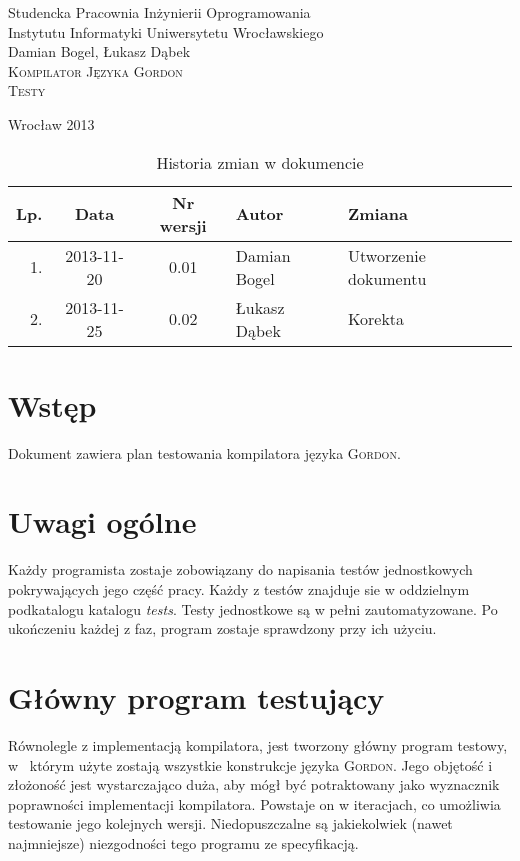 \documentclass{documentation}
\begin{document}
\begin{titlepage}
\begin{center}
Studencka Pracownia Inżynierii Oprogramowania\\
Instytutu Informatyki Uniwersytetu Wrocławskiego\\[6cm]

Damian Bogel, Łukasz Dąbek\\[1cm]
\textsc{\LARGE Kompilator Języka Gordon}\\[0.5cm]
\textsc{\large Testy}

\vfill
Wrocław 2013 \\[2.5cm]

\end{center}
\end{titlepage}

\newpage
\begin{table}
	\centering
    \captionsetup{name=Tabela,labelsep=period}
	\caption{Historia zmian w dokumencie}
		\begin{tabular}{|r|c|c|l|l|}
		\hline
		Lp.  & Data       & Nr wersji & Autor                 & Zmiana \\ \hline
		1.   & 2013-11-20 & 0.01 & Damian Bogel & Utworzenie dokumentu \\ \hline
		2.   & 2013-11-25 & 0.02 & Łukasz Dąbek & Korekta \\ \hline
	\end{tabular}
\end{table}
\newpage

\tableofcontents
\setcounter{page}{2}

\newpage

\section{Wstęp}
\noindent Dokument zawiera plan testowania kompilatora języka
\textsc{Gordon}.

\section{Uwagi ogólne}
\noindent Każdy programista zostaje zobowiązany do napisania testów
jednostkowych pokrywających jego część pracy. Każdy z testów znajduje sie w
oddzielnym podkatalogu katalogu \emph{tests}. Testy jednostkowe są w pełni
zautomatyzowane. Po ukończeniu każdej z faz, program zostaje sprawdzony przy
ich użyciu.

\section{Główny program testujący}
\noindent Równolegle z implementacją kompilatora, jest tworzony główny program
testowy, w~ którym użyte zostają wszystkie konstrukcje języka \textsc{Gordon}.
Jego objętość i złożoność jest wystarczająco duża, aby mógł być potraktowany
jako wyznacznik poprawności implementacji kompilatora. Powstaje on w iteracjach,
co umożliwia testowanie jego kolejnych wersji. Niedopuszczalne są
jakiekolwiek (nawet najmniejsze) niezgodności tego programu ze specyfikacją.
\end{document}
